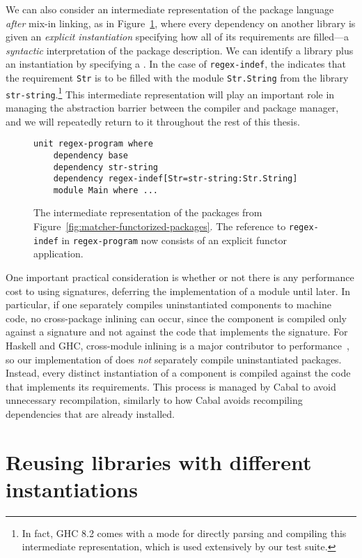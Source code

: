 We can also consider an intermediate representation of the package language
\emph{after} mix-in linking,
as in Figure~\ref{fig:matcher-bkp}, where every dependency on another library
is given an \emph{explicit instantiation} specifying how all of its requirements
are filled---a \emph{syntactic} interpretation of
the package description. We can identify a library plus an instantiation by
specifying a \emph{\uid{}}.  In the case of \verb|regex-indef|, the
\uid{} indicates that the requirement \verb|Str| is to be filled
with the module \verb|Str.String| from the library \verb|str-string|.\footnote{In
fact, GHC 8.2 comes with a mode for directly parsing and compiling this intermediate
representation, which is used extensively by our test suite.}  This intermediate
representation will play an important role in managing the abstraction barrier
between the compiler and package manager, and we will repeatedly return to
it throughout the rest of this thesis.

\begin{figure}
\begin{lstlisting}
unit regex-program where
    dependency base
    dependency str-string
    dependency regex-indef[Str=str-string:Str.String]
    module Main where ...
\end{lstlisting}
\caption{The intermediate representation of the packages from Figure~\ref{fig:matcher-functorized-packages}.
The reference to \texttt{regex-indef} in \texttt{regex-program} now consists of an explicit functor application.}
\label{fig:matcher-bkp}
\end{figure}

One important practical consideration is whether or not there is any
performance cost to using signatures, deferring the implementation of
a module until later.  In particular, if one separately
compiles uninstantiated components to machine code, no cross-package
inlining can occur, since the component is compiled only against a
signature and not against the code that implements the signature.  For
Haskell and GHC, cross-module inlining is a major contributor to
performance~\cite{PeytonJones:2002:SGH:968417.968422}, so our implementation of \Backpack{} does \emph{not}
separately compile uninstantiated packages. Instead, every distinct
instantiation of a component is compiled against the code that
implements its requirements. This process is managed by Cabal to avoid
unnecessary recompilation, similarly to how Cabal avoids recompiling
dependencies that are already installed.

\section{Reusing libraries with different instantiations}

